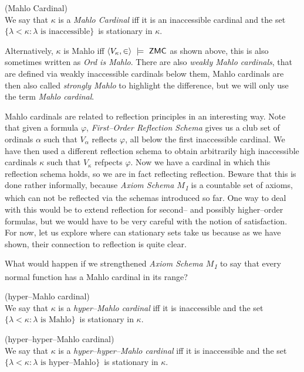 \begin{definition}{(Mahlo Cardinal)}\label{def:mahlo_cardinal}\\
We say that $\kappa$ is a \emph{Mahlo Cardinal} iff it is an inaccessible cardinal and the set $\{\lambda < \kappa : \lambda \mbox{ is inaccessible}\}$ is stationary in $\kappa$.
\end{definition}

Alternatively, $\kappa$ is Mahlo iff $\langle V_\kappa, \in \rangle~\models~\sf{ZMC}$ as shown above, this is also sometimes written as \emph{Ord is Mahlo}. There are also \emph{weakly Mahlo cardinals}, that are defined via weakly inaccessible cardinals below them, Mahlo cardinals are then also called \emph{strongly Mahlo} to highlight the difference, but we will only use the term \emph{Mahlo cardinal}.

Mahlo cardinals are related to reflection principles in an interesting way. Note that given a formula $\varphi$, \emph{First–Order Reflection Schema} gives us a club set of ordinals $\alpha$ such that $V_\alpha$ reflects $\varphi$, all below the first inaccessible cardinal. We have then used a different reflection schema to obtain arbitrarily high inaccessible cardinals $\kappa$ such that $V_\kappa$ refpects $\varphi$. Now we have a cardinal in which this reflection schema holds, so we are in fact reflecting reflection. Beware that this is done rather informally, because \emph{Axiom Schema $M$\textsubscript{1}} is a countable set of axioms, which can not be reflected via the schemas introduced so far. One way to deal with this would be to extend reflection for second– and possibly higher–order formulas, but we would have to be very careful with the notion of satisfaction. %
For now, let us explore where can stationary sets take us because as we have shown, their connection to reflection is quite clear.

What would happen if we strengthened \emph{Axiom Schema $M$\textsubscript{1}} to say that every normal function has a Mahlo cardinal in its range?

\begin{definition}{(hyper–Mahlo cardinal)}\label{def:hyper_mahlo_cardinal}\\
We say that $\kappa$ is a \emph{hyper–Mahlo cardinal} iff it is inaccessible and the set $\{\lambda < \kappa : \lambda \mbox{ is Mahlo}\}$ is stationary in $\kappa$.
\end{definition}

\begin{definition}{(hyper–hyper–Mahlo cardinal)}\label{def:hyper_hyper_mahlo_cardinal}\\
We say that $\kappa$ is a \emph{hyper–hyper–Mahlo cardinal} iff it is inaccessible and the set $\{\lambda < \kappa : \lambda \mbox{ is hyper–Mahlo}\}$ is stationary in $\kappa$.
\end{definition}

